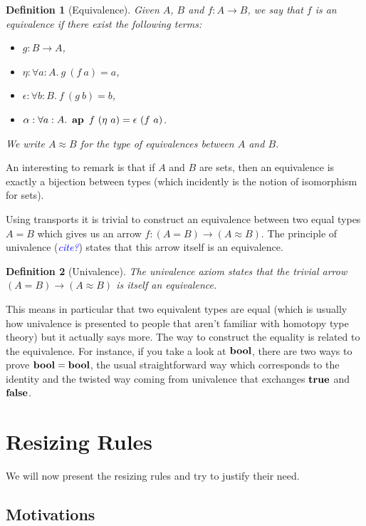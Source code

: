 \documentclass[11pt]{article}
\theoremstyle{plain}
\newtheorem{definition}{Definition}
\theoremstyle{remark}
\newcommand\meta[1]{\noindent\textcolor{blue}{\emph{#1}}}
\begin{document}
\begin{definition}[Equivalence]
  Given $A$, $B$ and $f : A \to B$, we say that $f$ is an equivalence
  if there exist the following terms:
  \begin{itemize}
    \item $g : B \to A$,
    \item $\eta : \forall a:A.\ g\ (f\ a) = a$,
    \item $\epsilon : \forall b:B.\ f\ (g\ b) = b$,
    \item $\alpha : \forall a:A.\ \ap\ f\ (\eta\ a) = \epsilon\ (f\ a)$.
  \end{itemize}
  We write $A \approx B$ for the type of equivalences between $A$ and $B$.
\end{definition}

\noindent
An interesting to remark is that if $A$ and $B$ are sets, then an equivalence is
exactly a bijection between types (which incidently is the notion of isomorphism
for sets).

Using transports it is trivial to construct an equivalence between two equal
types $A = B$ which gives us an arrow $f : (A = B) \to (A \approx B)$.
The principle of univalence (\meta{cite?}) states that this arrow itself is an
equivalence.

\begin{definition}[Univalence]
  The univalence axiom states that
  the trivial arrow $(A = B) \to (A \approx B)$ is itself an equivalence.
\end{definition}

\noindent
This means in particular that two equivalent types are equal (which is usually
how univalence is presented to people that aren't familiar with homotopy type
theory) but it actually says more. The way to construct the equality is related
to the equivalence.
For instance, if you take a look at $\operatorname{\mathbf{bool}}$, there are two ways to prove
$\operatorname{\mathbf{bool}} = \operatorname{\mathbf{bool}}$, the usual straightforward way which corresponds to the identity
and the twisted way coming from univalence that exchanges $\operatorname{\mathbf{true}}$ and $\operatorname{\mathbf{false}}$.

\section{Resizing Rules}

We will now present the resizing rules and try to justify their need.

\subsection{Motivations}
\end{document}
